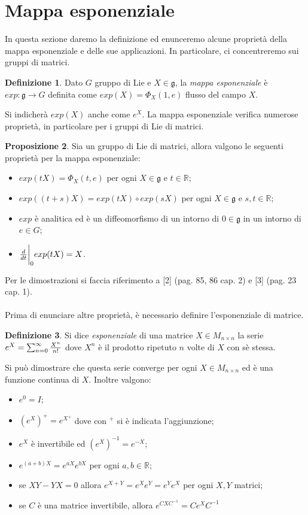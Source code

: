 \documentclass[12pt,a4paper]{report}
\theoremstyle{definition}
\newtheorem{Def}{Definizione}[chapter]
\newtheorem{Prop}[Def]{Proposizione}
\theoremstyle{definition}
\theoremstyle{definition}
\theoremstyle{definition}
\begin{document}
\section{Mappa esponenziale}
In questa sezione daremo la definizione ed enunceremo alcune proprietà della mappa esponenziale e delle sue applicazioni. In particolare, ci concentreremo sui gruppi di matrici.
\begin{Def}
	Dato $G$ gruppo di Lie e $X\in\mathfrak{g}$, la \textit{mappa esponenziale} è \\$exp:\mathfrak{g}\rightarrow G$ definita come $exp(X)=\Phi_X(1,e)$ flusso del campo $X$.
\end{Def}
Si indicherà $exp(X)$ anche come $e^X$.
La mappa esponenziale verifica numerose proprietà, in particolare per i gruppi di Lie di matrici.
\begin{Prop}
	Sia un gruppo di Lie di matrici, allora valgono le seguenti proprietà per la mappa esponenziale:\begin{itemize}
		\item $exp(tX)=\Phi_X(t,e)$ per ogni $X\in \mathfrak{g}$ e $t\in \mathbb{R}$;
		\item $exp((t+s)X)=exp(tX)\circ exp(sX)$ per ogni $X\in \mathfrak{g}$ e $s,t\in\mathbb{R}$;
		\item $exp$ è analitica ed è un diffeomorfismo di un intorno di $0\in\mathfrak{g}$ in un intorno di $e\in G$;
		\item ${d\over dt}\bigg{\rvert}_0exp(tX)=X$. 
	\end{itemize}
\end{Prop}
Per le dimostrazioni si faccia riferimento a [2] (pag. 85, 86 cap. 2) e [3] (pag. 23 cap. 1).\\
\\
Prima di enunciare altre proprietà, è necessario definire l'esponenziale di matrice.
\begin{Def}
	Si dice \textit{esponenziale} di una matrice $X\in M_{n\times n}$ la serie \\$e^X=\sum_{n=0}^{\infty}{X^n\over n! }$ dove $X^n$ è il prodotto ripetuto $n$ volte di $X$ con sè stessa.
\end{Def}
Si può dimostrare che questa serie converge per ogni $X\in M_{n\times n}$ ed è una funzione continua di $X$. Inoltre valgono:\begin{itemize}
	\item $e^0=I$;
	\item $(e^X)^+=e^{X^+}$ dove con $^+$ si è indicata l'aggiunzione;
	\item $e^X$ è invertibile ed $(e^X)^{-1}=e^{-X}$;
	\item $e^{(a+b)X}=e^{aX}e^{bX}$ per ogni $a,b\in\mathbb{R}$;
	\item se $XY-YX=0$ allora $e^{X+Y}=e^Xe^Y=e^Ye^X$ per ogni $X,Y$ matrici;\\
	\item se $C$ è una matrice invertibile, allora $e^{CXC^{-1}}=Ce^XC^{-1}$
\end{itemize} 
\end{document}
